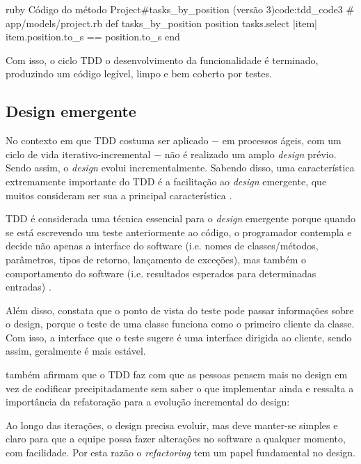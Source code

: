 \begin{mycode}{ruby}%
{Código do método Project\#tasks\_by\_position (versão 3)}{code:tdd_code3}
# app/models/project.rb
def tasks_by_position position
  tasks.select { |item| item.position.to_s == position.to_s }
end
\end{mycode}

Com isso, o ciclo TDD o desenvolvimento da funcionalidade é terminado, produzindo um código legível, limpo e bem coberto por testes.

\subsection{Design emergente} %
\label{sub:design_emergente}

No contexto em que TDD costuma ser aplicado $-$ em processos ágeis, com um ciclo de vida iterativo-incremental $-$ não é realizado um amplo \textit{design} prévio. Sendo assim, o \textit{design} evolui incrementalmente. Sabendo disso, uma característica extremamente importante do TDD é a facilitação ao \textit{design} emergente, que muitos consideram ser sua a principal característica \cite{EmergentDesign}.

TDD é considerada uma técnica essencial para o \textit{design} emergente porque
quando se está escrevendo um teste anteriormente ao código, o programador contempla e decide não apenas a interface do software (i.e. nomes de classes/métodos, parâmetros, tipos de retorno, lançamento de exceções), mas também o comportamento do software (i.e. resultados esperados para determinadas entradas) \cite{JanzenTDD}.

Além disso,  constata que o ponto de vista do teste pode passar informações sobre o design, porque o teste de uma classe funciona como o primeiro cliente da classe. Com isso, a interface que o teste sugere é uma interface dirigida ao cliente, sendo assim, geralmente é mais estável.

 também afirmam que o TDD faz com que as pessoas pensem mais no design em vez de codificar precipitadamente sem saber o que implementar ainda e  ressalta a importância da refatoração para a evolução incremental do design:

\begin{citacao}
Ao longo das iterações, o design precisa evoluir, mas deve manter-se simples e claro para que a equipe possa fazer alterações no software a qualquer momento, com facilidade. Por esta razão o \textit{refactoring} tem um papel fundamental no design.
\end{citacao}

